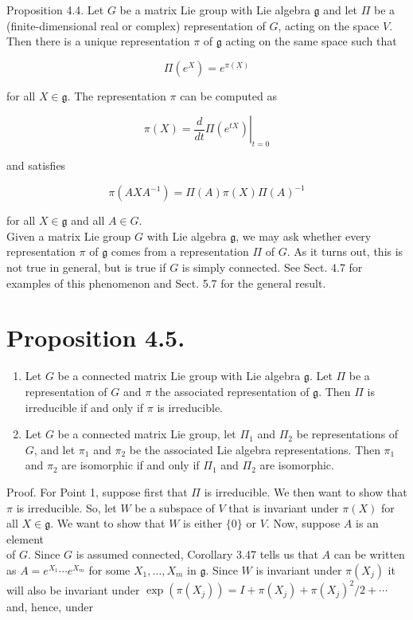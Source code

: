 \documentclass[10pt, letterpaper]{article}
\begin{document}
Proposition 4.4. Let $G$ be a matrix Lie group with Lie algebra $\mathfrak{g}$ and let $\Pi$ be a (finite-dimensional real or complex) representation of $G$, acting on the space $V$. Then there is a unique representation $\pi$ of $\mathfrak{g}$ acting on the same space such that

$$
\Pi\left(e^{X}\right)=e^{\pi(X)}
$$

for all $X \in \mathfrak{g}$. The representation $\pi$ can be computed as

$$
\pi(X)=\left.\frac{d}{d t} \Pi\left(e^{t X}\right)\right|_{t=0}
$$

and satisfies

$$
\pi\left(A X A^{-1}\right)=\Pi(A) \pi(X) \Pi(A)^{-1}
$$

for all $X \in \mathfrak{g}$ and all $A \in G$.\\
Given a matrix Lie group $G$ with Lie algebra $\mathfrak{g}$, we may ask whether every representation $\pi$ of $\mathfrak{g}$ comes from a representation $\Pi$ of $G$. As it turns out, this is not true in general, but is true if $G$ is simply connected. See Sect. 4.7 for examples of this phenomenon and Sect. 5.7 for the general result.

\section*{Proposition 4.5.}
\begin{enumerate}
  \item Let $G$ be a connected matrix Lie group with Lie algebra $\mathfrak{g}$. Let $\Pi$ be a representation of $G$ and $\pi$ the associated representation of $\mathfrak{g}$. Then $\Pi$ is irreducible if and only if $\pi$ is irreducible.
  \item Let $G$ be a connected matrix Lie group, let $\Pi_{1}$ and $\Pi_{2}$ be representations of $G$, and let $\pi_{1}$ and $\pi_{2}$ be the associated Lie algebra representations. Then $\pi_{1}$ and $\pi_{2}$ are isomorphic if and only if $\Pi_{1}$ and $\Pi_{2}$ are isomorphic.
\end{enumerate}

Proof. For Point 1, suppose first that $\Pi$ is irreducible. We then want to show that $\pi$ is irreducible. So, let $W$ be a subspace of $V$ that is invariant under $\pi(X)$ for all $X \in \mathfrak{g}$. We want to show that $W$ is either $\{0\}$ or $V$. Now, suppose $A$ is an element\\
of $G$. Since $G$ is assumed connected, Corollary 3.47 tells us that $A$ can be written as $A=e^{X_{1}} \cdots e^{X_{m}}$ for some $X_{1}, \ldots, X_{m}$ in $\mathfrak{g}$. Since $W$ is invariant under $\pi\left(X_{j}\right)$ it will also be invariant under $\exp \left(\pi\left(X_{j}\right)\right)=I+\pi\left(X_{j}\right)+\pi\left(X_{j}\right)^{2} / 2+\cdots$ and, hence, under
\end{document}

